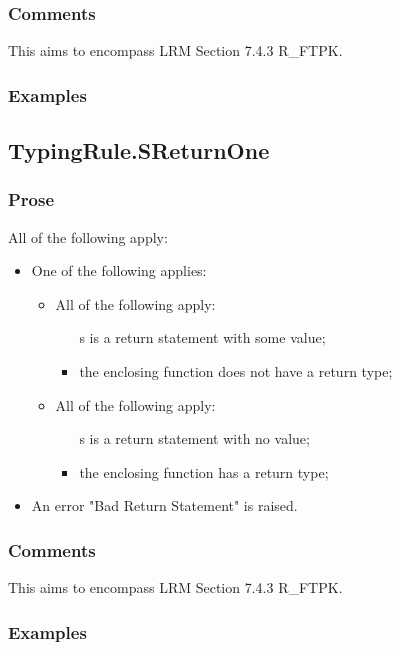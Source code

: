 \documentclass{book}
\begin{document}
    \subsubsection{Comments}
    This aims to encompass LRM Section 7.4.3 R\_FTPK.

    \subsubsection{Examples}

\subsection{TypingRule.SReturnOne}

    \subsubsection{Prose}
    All of the following apply:
   \begin{itemize}
   \item One of the following applies:
     \begin{itemize}
     \item All of the following apply:
       \begin{itemize}
       \item [s] is a return statement with some value;
       \item the enclosing function does not have a return type;
       \end{itemize}
     \item All of the following apply:
       \begin{itemize}
       \item [s] is a return statement with no value;
       \item the enclosing function has a return type;
       \end{itemize}
     \end{itemize}
   \item An error "Bad Return Statement" is raised.
   \end{itemize}

    \subsubsection{Comments}
    This aims to encompass LRM Section 7.4.3 R\_FTPK.

    \subsubsection{Examples}
\end{document}
